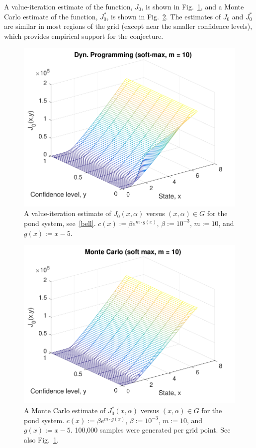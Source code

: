 \documentclass[letterpaper, 10 pt, conference]{ieeeconf}  %
\begin{document}
A value-iteration estimate of the function, $J_0$, is shown in Fig.~\ref{J0dp}, and a Monte Carlo estimate of the function, $J_0^*$, is shown in Fig.~\ref{J0mc}.
The estimates of $J_0$ and $J_0^*$ are similar in most regions of the grid (except near the smaller confidence levels),
which provides empirical support for the conjecture.
 
\begin{figure}[thpb]
      \centering
      \includegraphics[scale=0.5]{dyn_prog_J0_sept112018.pdf}
      \caption{A value-iteration estimate of $J_0(x,\alpha)$ versus $(x, \alpha) \in G$ for the pond system, see~\eqref{bell}.
	  $c(x) := \beta e^{m\cdot g(x)}$, $\beta := 10^{-3}$, $m := 10$, and $g(x) := x-5$.}
      \label{J0dp}
\end{figure}

\begin{figure}[thpb]
      \centering
      \includegraphics[scale=0.5]{monte_carlo_sum_sept112018.pdf}
      \caption{A Monte Carlo estimate of $J_0^*(x, \alpha)$ versus $(x, \alpha) \in G$ for the pond system.
	  $c(x) := \beta e^{m \cdot g(x)}$, $\beta := 10^{-3}$, $m := 10$, and $g(x) := x-5$.
	  100,000 samples were generated per grid point. See also Fig.~\ref{J0dp}.}
      \label{J0mc}
\end{figure}
\end{document}
